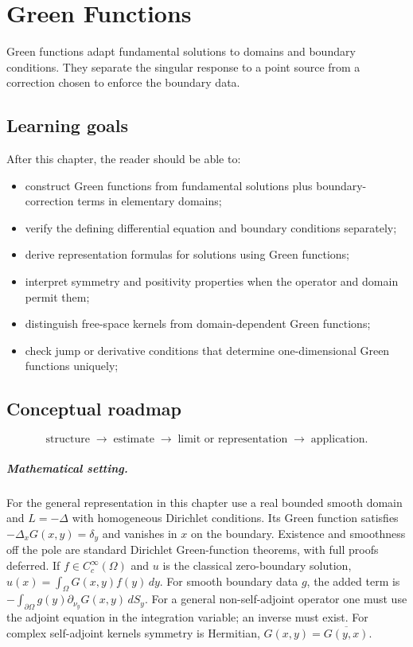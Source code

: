 \chapter{Green Functions}
\label{ch:iii25}

Green functions adapt fundamental solutions to domains and boundary conditions. They separate the singular response to a point source from a correction chosen to enforce the boundary data.

\section*{Learning goals}
After this chapter, the reader should be able to:
\begin{itemize}
\item construct Green functions from fundamental solutions plus boundary-correction terms in elementary domains;
\item verify the defining differential equation and boundary conditions separately;
\item derive representation formulas for solutions using Green functions;
\item interpret symmetry and positivity properties when the operator and domain permit them;
\item distinguish free-space kernels from domain-dependent Green functions;
\item check jump or derivative conditions that determine one-dimensional Green functions uniquely;
\end{itemize}
\section*{Conceptual roadmap}
\[
\boxed{\text{structure}\;\longrightarrow\;\text{estimate}\;\longrightarrow\;\text{limit or representation}\;\longrightarrow\;\text{application}.}
\]

\paragraph{Mathematical setting.}
For the general representation in this chapter use a real bounded smooth domain and $L=-\Delta$ with homogeneous Dirichlet conditions. Its Green function satisfies $-\Delta_xG(x,y)=\delta_y$ and vanishes in $x$ on the boundary. Existence and smoothness off the pole are standard Dirichlet Green-function theorems, with full proofs deferred. If $f\in C_c^\infty(\Omega)$ and $u$ is the classical zero-boundary solution, $u(x)=\int_\Omega G(x,y)f(y)\,dy$. For smooth boundary data $g$, the added term is $-\int_{\partial\Omega}g(y)\partial_{\nu_y}G(x,y)\,dS_y$. For a general non-self-adjoint operator one must use the adjoint equation in the integration variable; an inverse must exist. For complex self-adjoint kernels symmetry is Hermitian, $G(x,y)=\overline{G(y,x)}$.

